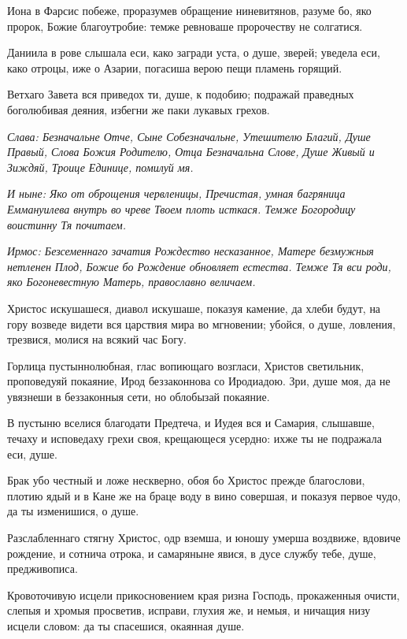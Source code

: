 Иона в Фарсис побеже, проразумев обращение ниневитянов, разуме бо, яко пророк, Божие благоутробие: темже ревноваше пророчеству не солгатися. 

Даниила в рове слышала еси, како загради уста, о душе, зверей; уведела еси, како отроцы, иже о Азарии, погасиша верою пещи пламень горящий. 

Ветхаго Завета вся приведох ти, душе, к подобию; подражай праведных боголюбивая деяния, избегни же паки лукавых грехов. 

\itshape Слава\normalfont{}: Безначальне Отче, Сыне Собезначальне, Утешителю Благий, Душе Правый, Слова Божия Родителю, Отца Безначальна Слове, Душе Живый и Зиждяй, Троице Единице, помилуй мя. 

\itshape И ныне\normalfont{}: Яко от оброщения червленицы, Пречистая, умная багряница Еммануилева внутрь во чреве Твоем плоть исткася. Темже Богородицу воистинну Тя почитаем. 


\itshape Ирмос\normalfont{}: Безсеменнаго зачатия Рождество несказанное, Матере безмужныя нетленен Плод, Божие бо Рождение обновляет естества. Темже Тя вси роди, яко Богоневестную Матерь, православно величаем. 

Христос искушашеся, диавол искушаше, показуя камение, да хлеби будут, на гору возведе видети вся царствия мира во мгновении; убойся, о душе, ловления, трезвися, молися на всякий час Богу. 

Горлица пустыннолюбная, глас вопиющаго возгласи, Христов светильник, проповедуяй покаяние, Ирод беззаконнова со Иродиадою. Зри, душе моя, да не увязнеши в беззаконныя сети, но облобызай покаяние. 

В пустыню вселися благодати Предтеча, и Иудея вся и Самария, слышавше, течаху и исповедаху грехи своя, крещающеся усердно: ихже ты не подражала еси, душе. 

Брак убо честный и ложе нескверно, обоя бо Христос прежде благослови, плотию ядый и в Кане же на браце воду в вино совершая, и показуя первое чудо, да ты изменишися, о душе. 

Разслабленнаго стягну Христос, одр вземша, и юношу умерша воздвиже, вдовиче рождение, и сотнича отрока, и самаряныне явися, в дусе службу тебе, душе, предживописа. 

Кровоточивую исцели прикосновением края ризна Господь, прокаженныя очисти, слепыя и хромыя просветив, исправи, глухия же, и немыя, и ничащия низу исцели словом: да ты спасешися, окаянная душе. 

